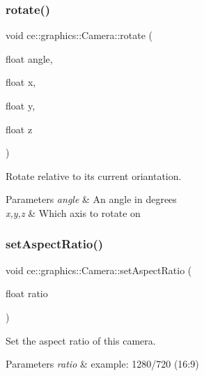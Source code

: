 \subsubsection{\texorpdfstring{rotate()}{rotate()}\hspace{0.1cm}{\footnotesize\ttfamily [2/2]}}
{\footnotesize\ttfamily void ce\+::graphics\+::\+Camera\+::rotate (\begin{DoxyParamCaption}\item[{float}]{angle,  }\item[{float}]{x,  }\item[{float}]{y,  }\item[{float}]{z }\end{DoxyParamCaption})}



Rotate relative to its current oriantation. 


\begin{DoxyParams}{Parameters}
{\em angle} & An angle in degrees \\
\hline
{\em x,y,z} & Which axis to rotate on \\
\hline
\end{DoxyParams}
\mbox{\label{classce_1_1graphics_1_1_camera_a852f190ecd41998257e92d5e56769bce}} 
\subsubsection{\texorpdfstring{set\+Aspect\+Ratio()}{setAspectRatio()}}
{\footnotesize\ttfamily void ce\+::graphics\+::\+Camera\+::set\+Aspect\+Ratio (\begin{DoxyParamCaption}\item[{float}]{ratio }\end{DoxyParamCaption})}



Set the aspect ratio of this camera. 


\begin{DoxyParams}{Parameters}
{\em ratio} & example\+: 1280/720 (16\+:9) \\
\hline
\end{DoxyParams}
\mbox{\label{classce_1_1graphics_1_1_camera_a46c1c89dd83bcd2991d41e5b87555704}} 
